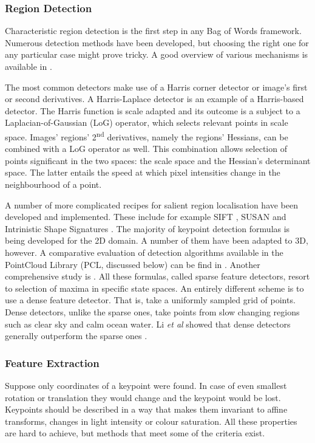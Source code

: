		\subsubsection{Region Detection}
		Characteristic region detection is the first step in any Bag of Words framework. Numerous detection methods have been developed, but choosing the right one for any particular case might prove tricky. A good overview of various mechanisms is available in \cite{tsai2012bag}.
		
		The most common detectors make use of a Harris corner detector or image's first or second derivatives. A Harris-Laplace detector is an example of a Harris-based detector. The Harris function is scale adapted and its outcome is a subject to a Laplacian-of-Gaussian (LoG) operator, which selects relevant points in scale space. Images' regions' 2\textsuperscript{nd} derivatives, namely the regions' Hessians, can be combined with a LoG operator as well. This combination allows selection of points significant in the two spaces: the scale space and the Hessian's determinant space. The latter entails the speed at which pixel intensities change in the neighbourhood of a point.	
	
		A number of more complicated recipes for salient region localisation have been developed and implemented. These include for example SIFT \cite{sift_keypoint}, SUSAN \cite{susan_keypoint} and Intrinistic Shape Signatures \cite{iss_keypoint}. The majority of keypoint detection formulas is being developed for the 2D domain. A number of them have been adapted to 3D, however. A comparative evaluation of detection algorithms available in the PointCloud Library (PCL, discussed below) can be find in \cite{pcl_keypoint_comparision}. Another comprehensive study is \cite{3d_keypoint_eval}. All these formulas, called sparse feature detectors, resort to selection of maxima in specific state spaces. An entirely different scheme is to use a dense feature detector. That is, take a uniformly sampled grid of points. Dense detectors, unlike the sparse ones, take points from slow changing regions such as clear sky and calm ocean water. Li \emph{et al} showed that dense detectors generally outperform the sparse ones \cite{fei2005bayesian}.
		
		\subsubsection{Feature Extraction}
		Suppose only coordinates of a keypoint were found. In case of even smallest rotation or translation they would change and the keypoint would be lost. Keypoints should be described in a way that makes them invariant to affine transforms, changes in light intensity or colour saturation. All these properties are hard to achieve, but methods that meet some of the criteria exist.
		
